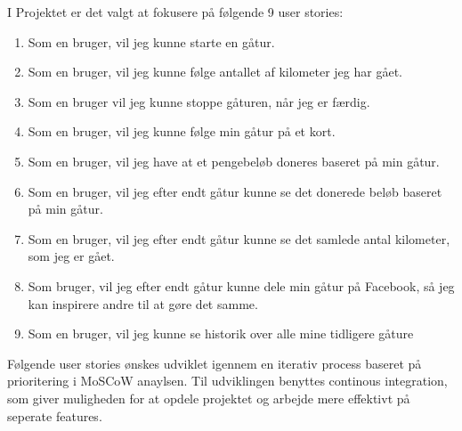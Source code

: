 I Projektet er det valgt at fokusere på følgende 9 user stories:
\begin{enumerate}

\item Som en bruger, vil jeg kunne starte en gåtur.
\item Som en bruger, vil jeg kunne følge antallet af kilometer jeg har gået. 
\item Som en bruger vil jeg kunne stoppe gåturen, når jeg er færdig. 
\item Som en bruger, vil jeg kunne følge min gåtur på et kort. 
\item Som en bruger, vil jeg have at et pengebeløb doneres baseret på min gåtur. 
\item Som en bruger, vil jeg efter endt gåtur kunne se det donerede beløb baseret på min gåtur. 
\item Som en bruger, vil jeg efter endt gåtur kunne se det samlede antal kilometer, som jeg er gået. 
\item Som bruger, vil jeg efter endt gåtur kunne dele min gåtur på Facebook, så jeg kan inspirere andre til at gøre det samme. 
\item Som en bruger, vil jeg kunne se historik over alle mine tidligere gåture
\end{enumerate}

Følgende user stories ønskes udviklet igennem en iterativ process baseret på prioritering i MoSCoW anaylsen. Til udviklingen benyttes continous integration, som giver muligheden for at opdele projektet og arbejde mere effektivt på seperate features.